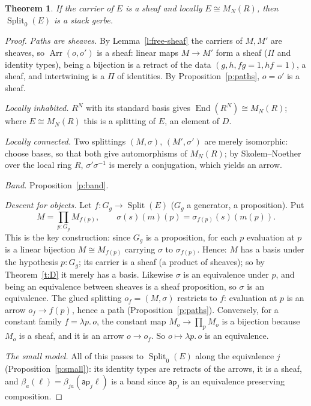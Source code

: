 \documentclass[11pt]{amsart}
\newtheorem{theorem}{Theorem}[section]
\theoremstyle{definition}
\theoremstyle{remark}
\newcommand{\End}{\operatorname{End}}
\newcommand{\Arr}{\operatorname{Arr}}
\newcommand{\Split}{\operatorname{Split}}
\newcommand{\Mat}{M_N(R)}
\newcommand{\ap}{\mathsf{ap}}
\begin{document}
\begin{theorem}\label{t:split}
If the carrier of $E$ is a sheaf and locally $E\cong\Mat$, then
$\Split_0(E)$ is a stack gerbe.
\end{theorem}
\begin{proof}
\emph{Paths are sheaves.} By Lemma~\ref{l:free-sheaf} the carriers of $M,M'$
are sheaves, so $\Arr(o,o')$ is a sheaf: linear maps $M\to M'$ form a sheaf
($\Pi$ and identity types), being a bijection is a retract of the data
$(g,h,fg=1,hf=1)$, a sheaf, and intertwining is a $\Pi$ of identities. By
Proposition~\ref{p:paths}, $o=o'$ is a sheaf.

\emph{Locally inhabited.} $R^N$ with its standard basis gives
$\End(R^N)\cong\Mat$; where $E\cong\Mat$ this is a splitting of $E$, an
element of $D$.

\emph{Locally connected.} Two splittings $(M,\sigma)$, $(M',\sigma')$ are
merely isomorphic: choose bases, so that both give automorphisms of $\Mat$;
by Skolem--Noether over the local ring $R$, $\sigma'\sigma^{-1}$ is merely
a conjugation, which yields an arrow.

\emph{Band.} Proposition~\ref{p:band}.

\emph{Descent for objects.} Let $f:G_g\to\Split(E)$ ($G_g$ a generator, a
proposition). Put
\[M=\prod_{p:G_g}M_{f(p)},\qquad \sigma(s)(m)(p)=\sigma_{f(p)}(s)(m(p)).\]
This is the key construction: since $G_g$ is a proposition, for each $p$
evaluation at $p$ is a linear bijection $M\cong M_{f(p)}$ carrying $\sigma$ to $\sigma_{f(p)}$. Hence:
$M$ has a basis under the hypothesis $p:G_g$; its carrier is a sheaf (a
product of sheaves); so by Theorem~\ref{t:D} it merely has a basis.
Likewise $\sigma$ is an equivalence under $p$, and being an equivalence
between sheaves is a sheaf proposition, so $\sigma$ is an equivalence. The
glued splitting $o_f=(M,\sigma)$ restricts to $f$: evaluation at $p$ is an
arrow $o_f\to f(p)$, hence a path (Proposition~\ref{p:paths}). Conversely,
for a constant family $f=\lambda p.\,o$, the constant map
$M_o\to\prod_{p}M_o$ is a bijection because $M_o$ is a sheaf, and it is an
arrow $o\to o_f$. So $o\mapsto\lambda p.\,o$ is an equivalence.

\emph{The small model.} All of this passes to $\Split_0(E)$ along the
equivalence $j$ (Proposition~\ref{p:small}): its identity types are
retracts of the arrows, it is a sheaf, and $\beta_a(\ell)=\beta_{j
a}(\ap_j\ell)$ is a band since $\ap_j$ is an equivalence preserving
composition.
\end{proof}
\end{document}
